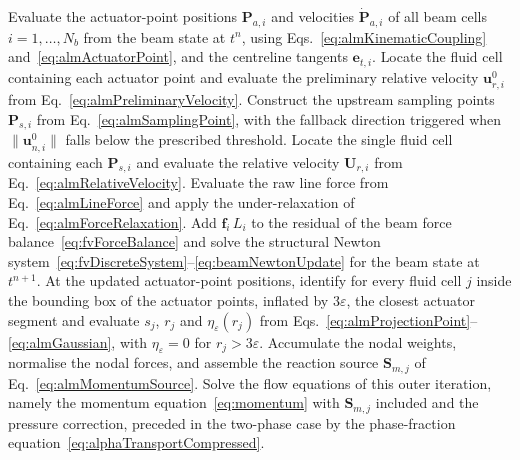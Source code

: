 \begin{algorithm}[!ht]
\caption{Actuator-line beam--fluid coupling within one time step. The coupling operations of steps~\ref{alg:stepActuator}--\ref{alg:stepSource} run only on the first outer iteration of the PIMPLE loop, and the source $\mathbf{S}_{m,j}$ they produce is held fixed for the remaining outer iterations.}
\label{alg:almCoupling}
\begin{algorithmic}[1]
\STATE Evaluate the actuator-point positions $\mathbf{P}_{a,i}$ and velocities $\dot{\mathbf{P}}_{a,i}$ of all beam cells $i=1,\ldots,N_{b}$ from the beam state at $t^{n}$, using Eqs.~\eqref{eq:almKinematicCoupling} and~\eqref{eq:almActuatorPoint}, and the centreline tangents $\mathbf{e}_{t,i}$. \label{alg:stepActuator}
\STATE Locate the fluid cell containing each actuator point and evaluate the preliminary relative velocity $\mathbf{u}^{0}_{r,i}$ from Eq.~\eqref{eq:almPreliminaryVelocity}. \label{alg:stepLocateA}
\STATE Construct the upstream sampling points $\mathbf{P}_{s,i}$ from Eq.~\eqref{eq:almSamplingPoint}, with the fallback direction triggered when $\lVert\mathbf{u}^{0}_{n,i}\rVert$ falls below the prescribed threshold. \label{alg:stepSamplingPts}
\STATE Locate the single fluid cell containing each $\mathbf{P}_{s,i}$ and evaluate the relative velocity $\mathbf{U}_{r,i}$ from Eq.~\eqref{eq:almRelativeVelocity}. \label{alg:stepLocateS}
\STATE Evaluate the raw line force from Eq.~\eqref{eq:almLineForce} and apply the under-relaxation of Eq.~\eqref{eq:almForceRelaxation}.
\STATE Add $\mathbf{f}_{i}\,L_{i}$ to the residual of the beam force balance~\eqref{eq:fvForceBalance} and solve the structural Newton system~\eqref{eq:fvDiscreteSystem}--\eqref{eq:beamNewtonUpdate} for the beam state at $t^{n+1}$.
\STATE At the updated actuator-point positions, identify for every fluid cell $j$ inside the bounding box of the actuator points, inflated by $3\varepsilon$, the closest actuator segment and evaluate $s_{j}$, $r_{j}$ and $\eta_{\varepsilon}(r_{j})$ from Eqs.~\eqref{eq:almProjectionPoint}--\eqref{eq:almGaussian}, with $\eta_{\varepsilon} = 0$ for $r_{j} > 3\varepsilon$. \label{alg:stepProjection}
\STATE Accumulate the nodal weights, normalise the nodal forces, and assemble the reaction source $\mathbf{S}_{m,j}$ of Eq.~\eqref{eq:almMomentumSource}. \label{alg:stepSource}
\ENDIF
\STATE Solve the flow equations of this outer iteration, namely the momentum equation~\eqref{eq:momentum} with $\mathbf{S}_{m,j}$ included and the pressure correction, preceded in the two-phase case by the phase-fraction equation~\eqref{eq:alphaTransportCompressed}.
\ENDFOR
\ENDFOR
\end{algorithmic}
\end{algorithm}

